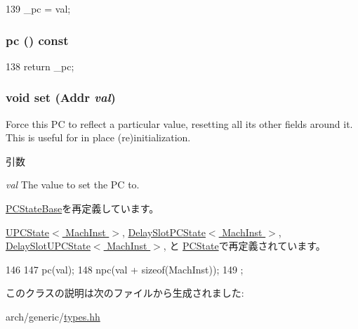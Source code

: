 \begin{DoxyCode}
139 { _pc = val; }
\end{DoxyCode}
\hypertarget{classGenericISA_1_1SimplePCState_a4012b666ba851e747ea4229c7cf55c5b}{
\subsubsection[{pc}]{ pc () const}}
\label{classGenericISA_1_1SimplePCState_a4012b666ba851e747ea4229c7cf55c5b}



\begin{DoxyCode}
138 { return _pc; }
\end{DoxyCode}
\hypertarget{classGenericISA_1_1SimplePCState_a9a5b900e841dd75dc81970850547918f}{
\subsubsection[{set}]{\setlength{\rightskip}{0pt plus 5cm}void set ({\bf Addr} {\em val})}}
\label{classGenericISA_1_1SimplePCState_a9a5b900e841dd75dc81970850547918f}
Force this PC to reflect a particular value, resetting all its other fields around it. This is useful for in place (re)initialization.


\begin{DoxyParams}{引数}
\item[{\em val}]The value to set the PC to. \end{DoxyParams}


\hyperlink{classGenericISA_1_1PCStateBase_a9a5b900e841dd75dc81970850547918f}{PCStateBase}を再定義しています。

\hyperlink{classGenericISA_1_1UPCState_a9a5b900e841dd75dc81970850547918f}{UPCState$<$ MachInst $>$}, \hyperlink{classGenericISA_1_1DelaySlotPCState_a9a5b900e841dd75dc81970850547918f}{DelaySlotPCState$<$ MachInst $>$}, \hyperlink{classGenericISA_1_1DelaySlotUPCState_a9a5b900e841dd75dc81970850547918f}{DelaySlotUPCState$<$ MachInst $>$}, と \hyperlink{classX86ISA_1_1PCState_a9a5b900e841dd75dc81970850547918f}{PCState}で再定義されています。


\begin{DoxyCode}
146     {
147         pc(val);
148         npc(val + sizeof(MachInst));
149     };
\end{DoxyCode}


このクラスの説明は次のファイルから生成されました:\begin{DoxyCompactItemize}
\item 
arch/generic/\hyperlink{arch_2generic_2types_8hh}{types.hh}\end{DoxyCompactItemize}
